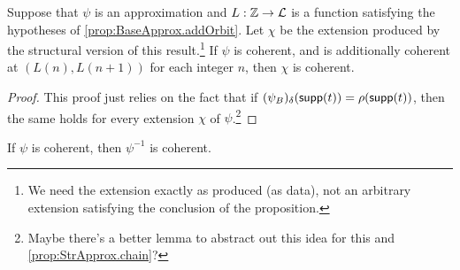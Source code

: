 \begin{proposition}
  \label{prop:StrApprox.addOrbit}
  Suppose that \( \psi \) is an approximation and \( L : \mathbb Z \to {\mathcal L} \) is a function satisfying the hypotheses of \cref{prop:BaseApprox.addOrbit}.
  Let \( \chi \) be the extension produced by the structural version of this result.\footnote{We need the extension exactly as produced (as data), not an arbitrary extension satisfying the conclusion of the proposition.}
  If \( \psi \) is coherent, and is additionally coherent at \( (L(n), L(n+1)) \) for each integer \( n \), then \( \chi \) is coherent.
\end{proposition}
\begin{proof}
  This proof just relies on the fact that if \( (\psi_B)_\delta(\operatorname{\mathsf{supp}}(t)) = \rho(\operatorname{\mathsf{supp}}(t)) \), then the same holds for every extension \( \chi \) of \( \psi \).\footnote{Maybe there's a better lemma to abstract out this idea for this and \cref{prop:StrApprox.chain}?}
\end{proof}
\begin{proposition}
  \label{prop:StrApprox.Coherent.inv}
  If \( \psi \) is coherent, then \( \psi^{-1} \) is coherent.
\end{proposition}
